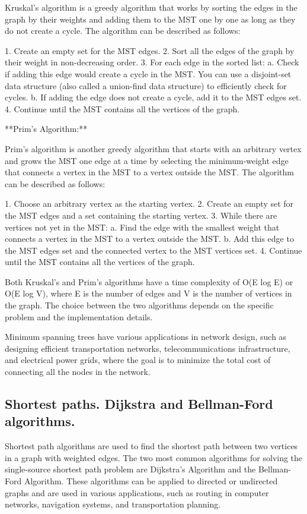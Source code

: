 \documentclass{article}
\begin{document}
Kruskal's algorithm is a greedy algorithm that works by sorting the edges in the graph by their weights and adding them to the MST one by one as long as they do not create a cycle. The algorithm can be described as follows:

1. Create an empty set for the MST edges.
2. Sort all the edges of the graph by their weight in non-decreasing order.
3. For each edge in the sorted list:
   a. Check if adding this edge would create a cycle in the MST. You can use a disjoint-set data structure (also called a union-find data structure) to efficiently check for cycles.
   b. If adding the edge does not create a cycle, add it to the MST edges set.
4. Continue until the MST contains all the vertices of the graph.

**Prim's Algorithm:**

Prim's algorithm is another greedy algorithm that starts with an arbitrary vertex and grows the MST one edge at a time by selecting the minimum-weight edge that connects a vertex in the MST to a vertex outside the MST. The algorithm can be described as follows:

1. Choose an arbitrary vertex as the starting vertex.
2. Create an empty set for the MST edges and a set containing the starting vertex.
3. While there are vertices not yet in the MST:
   a. Find the edge with the smallest weight that connects a vertex in the MST to a vertex outside the MST.
   b. Add this edge to the MST edges set and the connected vertex to the MST vertices set.
4. Continue until the MST contains all the vertices of the graph.

Both Kruskal's and Prim's algorithms have a time complexity of O(E log E) or O(E log V), where E is the number of edges and V is the number of vertices in the graph. The choice between the two algorithms depends on the specific problem and the implementation details.

Minimum spanning trees have various applications in network design, such as designing efficient transportation networks, telecommunications infrastructure, and electrical power grids, where the goal is to minimize the total cost of connecting all the nodes in the network.


\subsection{Shortest paths. Dijkstra and Bellman-Ford algorithms.}

Shortest path algorithms are used to find the shortest path between two vertices in a graph with weighted edges. The two most common algorithms for solving the single-source shortest path problem are Dijkstra's Algorithm and the Bellman-Ford Algorithm. These algorithms can be applied to directed or undirected graphs and are used in various applications, such as routing in computer networks, navigation systems, and transportation planning.
\end{document}
